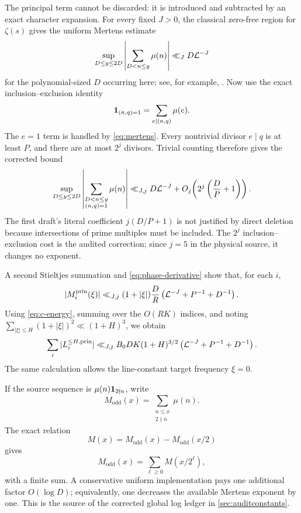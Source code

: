 The principal term cannot be discarded: it is introduced and subtracted by an
exact character expansion.  For every fixed $J>0$, the classical zero-free
region for $\zeta(s)$ gives the uniform Mertens estimate
\begin{equation}\label{eq:mertens}
             \sup_{D\le y\le2D}
             \left|\sum_{D<n\le y}\mu(n)\right|
             \ll_J D\mathcal L^{-J}
\end{equation}
for the polynomial-sized $D$ occurring here; see, for example,
\cite{MontgomeryVaughan2007}.  Now use the exact inclusion--exclusion identity
\[
             \mathbf 1_{(n,q)=1}=\sum_{e\mid(n,q)}\mu(e).
\]
The $e=1$ term is handled by \cref{eq:mertens}.  Every nontrivial divisor
$e\mid q$ is at least $P$, and there are at most $2^j$ divisors.  Trivial
counting therefore gives the corrected bound
\begin{equation}\label{eq:principal-coprime}
 \sup_{D\le y\le2D}
 \left|\sum_{\substack{D<n\le y\\(n,q)=1}}\mu(n)\right|
 \ll_{J,j}D\mathcal L^{-J}+O_j\!\left(2^j\left(\frac DP+1\right)\right).
\end{equation}
The first draft's literal coefficient $j(D/P+1)$ is not justified by direct
deletion because intersections of prime multiples must be included.  The
$2^j$ inclusion--exclusion cost is the audited correction; since $j=5$ in the
physical source, it changes no exponent.

A second Stieltjes summation and \cref{eq:phase-derivative} show that, for each
$i$,
\begin{equation}\label{eq:principal-Mxi}
 |M_i^{\mathrm{prin}}(\xi)|
 \ll_{J,j}(1+|\xi|)\frac DR
       \left(\mathcal L^{-J}+P^{-1}+D^{-1}\right).
\end{equation}
Using \cref{eq:c-energy}, summing over the $O(RK)$ indices, and noting
$\sum_{|\xi|\le H}(1+|\xi|)^2\ll(1+H)^3$, we obtain
\begin{equation}\label{eq:principal-transfer}
 \sum_i|L_i^{\le H,\mathrm{prin}}|
 \ll_{J,j}B_0DK(1+H)^{3/2}
       \left(\mathcal L^{-J}+P^{-1}+D^{-1}\right).
\end{equation}
The same calculation allows the line-constant target frequency $\xi=0$.

If the source sequence is $\mu(n)\mathbf 1_{2\nmid n}$, write
\[
 M_{\mathrm{odd}}(x)=\sum_{\substack{n\le x\\2\nmid n}}\mu(n).
\]
The exact relation
\[
       M(x)=M_{\mathrm{odd}}(x)-M_{\mathrm{odd}}(x/2)
\]
gives
\begin{equation}\label{eq:odd-recursion}
       M_{\mathrm{odd}}(x)=\sum_{\ell\ge0}M(x/2^\ell),
\end{equation}
with a finite sum.  A conservative uniform implementation pays one additional
factor $O(\log D)$; equivalently, one decreases the available Mertens exponent
by one.  This is the source of the corrected global log ledger in
\cref{sec:auditconstants}.

